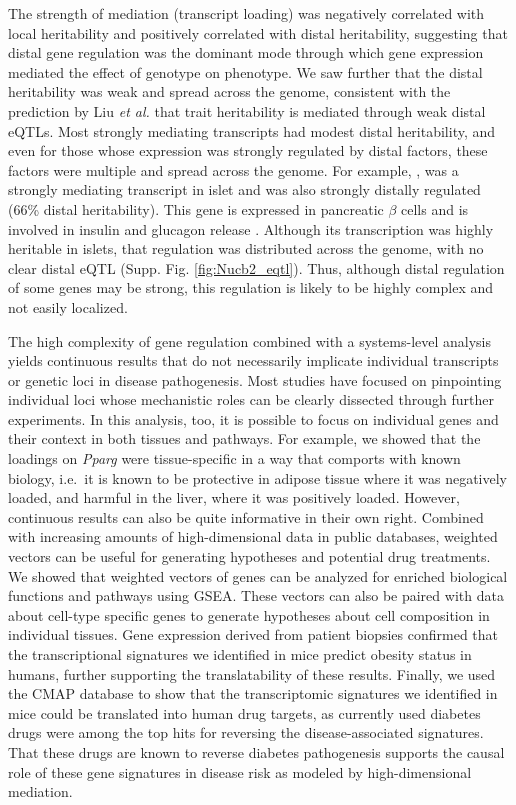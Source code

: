 \documentclass[
]{article}
\begin{document}
The strength of mediation (transcript loading) was negatively correlated
with local heritability and positively correlated with distal
heritability, suggesting that distal gene regulation was the dominant
mode through which gene expression mediated the effect of genotype on
phenotype. We saw further that the distal heritability was weak and
spread across the genome, consistent with the prediction by Liu
\textit{et al.} \cite{pmid31051098} that trait heritability is mediated
through weak distal eQTLs. Most strongly mediating transcripts had
modest distal heritability, and even for those whose expression was
strongly regulated by distal factors, these factors were multiple and
spread across the genome. For example, , was a strongly
mediating transcript in islet and was also strongly distally regulated
(66\% distal heritability). This gene is expressed in pancreatic
\(\beta\) cells and is involved in insulin and glucagon release
\cite{pmid22108805, pmid23537085, 
pmid24993278}. Although its transcription was highly heritable in
islets, that regulation was distributed across the genome, with no clear
distal eQTL (Supp. Fig. \ref{fig:Nucb2_eqtl}). Thus, although distal
regulation of some genes may be strong, this regulation is likely to be
highly complex and not easily localized.

The high complexity of gene regulation combined with a systems-level
analysis yields continuous results that do not necessarily implicate
individual transcripts or genetic loci in disease pathogenesis. Most
studies have focused on pinpointing individual loci whose mechanistic
roles can be clearly dissected through further experiments. In this
analysis, too, it is possible to focus on individual genes and their
context in both tissues and pathways. For example, we showed that the
loadings on \textit{Pparg} were tissue-specific in a way that comports
with known biology, i.e.~it is known to be protective in adipose tissue
where it was negatively loaded, and harmful in the liver, where it was
positively loaded. However, continuous results can also be quite
informative in their own right. Combined with increasing amounts of
high-dimensional data in public databases, weighted vectors can be
useful for generating hypotheses and potential drug treatments. We
showed that weighted vectors of genes can be analyzed for enriched
biological functions and pathways using GSEA. These vectors can also be
paired with data about cell-type specific genes to generate hypotheses
about cell composition in individual tissues. Gene expression derived
from patient biopsies confirmed that the transcriptional signatures we
identified in mice predict obesity status in humans, further supporting
the translatability of these results. Finally, we used the CMAP database
to show that the transcriptomic signatures we identified in mice could
be translated into human drug targets, as currently used diabetes drugs
were among the top hits for reversing the disease-associated signatures.
That these drugs are known to reverse diabetes pathogenesis supports the
causal role of these gene signatures in disease risk as modeled by
high-dimensional mediation.
\end{document}
